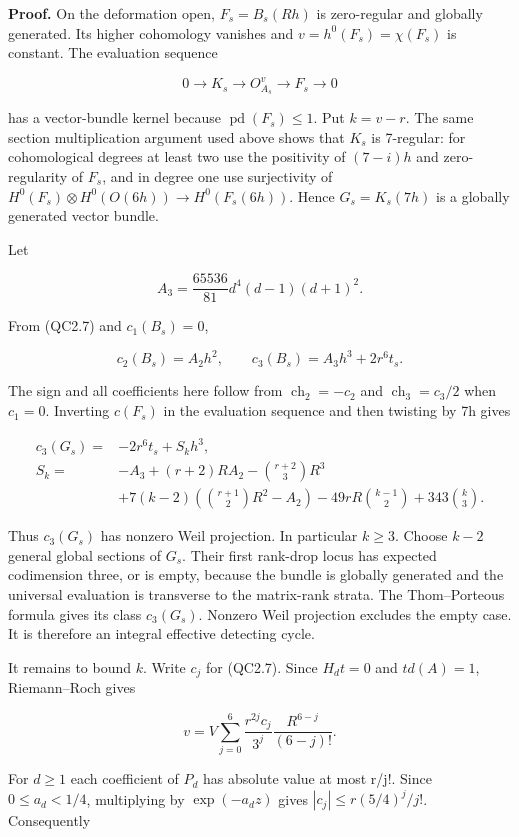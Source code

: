 \textbf{Proof.} On the deformation open, \(F_s=B_s(Rh)\) is zero-regular
and globally generated. Its higher cohomology vanishes and
\(v=h^{0}(F_s)=\chi (F_s)\) is constant. The evaluation sequence

\[
 0\to K_s\to O_{A_s}^{v}\to F_s\to0
\]

has a vector-bundle kernel because \(\operatorname{pd}(F_s)\le 1\). Put
\(k=v-r\). The same section multiplication argument used above shows
that \(K_s\) is 7-regular: for cohomological degrees at least two use
the positivity of \((7-i)h\) and zero-regularity of \(F_s\), and in
degree one use surjectivity of
\(H^{0}(F_s)\otimes H^{0}(O(6h))\to H^{0}(F_s(6h))\). Hence
\(G_s=K_s(7h)\) is a globally generated vector bundle.

Let

\[
 A_3=\frac{65536}{81}d^4(d-1)(d+1)^2.
\]

From (QC2.7) and \(c_{1}(B_s)=0\),

\[
 c_2(B_s)=A_2h^2,\qquad
 c_3(B_s)=A_3h^3+2r^6t_s.
 \tag{QC5.3}
\]

The sign and all coefficients here follow from
\(\operatorname{ch}_{2}=-c_{2}\) and \(\operatorname{ch}_{3}=c_{3}/2\)
when \(c_{1}=0\). Inverting \(c(F_s)\) in the evaluation sequence and
then twisting by 7h gives

\[
\begin{split}
 c_3(G_s)= {}&-2r^6t_s+ S_kh^3,\\
 S_k={}&-A_3+(r+2)R A_2-\binom{r+2}{3}R^3\\
 &+7(k-2)\left(\binom{r+1}{2}R^2-A_2\right)
   -49rR\binom{k-1}{2}+343\binom k3.
\end{split}
\tag{QC5.4}
\]

Thus \(c_{3}(G_s)\) has nonzero Weil projection. In particular
\(k\ge 3\). Choose \(k-2\) general global sections of \(G_s\). Their
first rank-drop locus has expected codimension three, or is empty,
because the bundle is globally generated and the universal evaluation is
transverse to the matrix-rank strata. The Thom--Porteous formula gives
its class \(c_{3}(G_s)\). Nonzero Weil projection excludes the empty
case. It is therefore an integral effective detecting cycle.

It remains to bound \(k\). Write \(c_j\) for (QC2.7). Since \(H_d t=0\)
and \(td(A)=1\), Riemann--Roch gives

\[
 v=V\sum_{j=0}^6\frac{r^{2j}c_j}{3^j}
                      \frac{R^{6-j}}{(6-j)!}.
\]

For \(d\ge 1\) each coefficient of \(P_d\) has absolute value at most
r/j!. Since \(0\le a_d<1/4\), multiplying by
\(\operatorname{exp}(-a_dz)\) gives \(|c_j|\le r(5/4)^j/j!\).
Consequently

